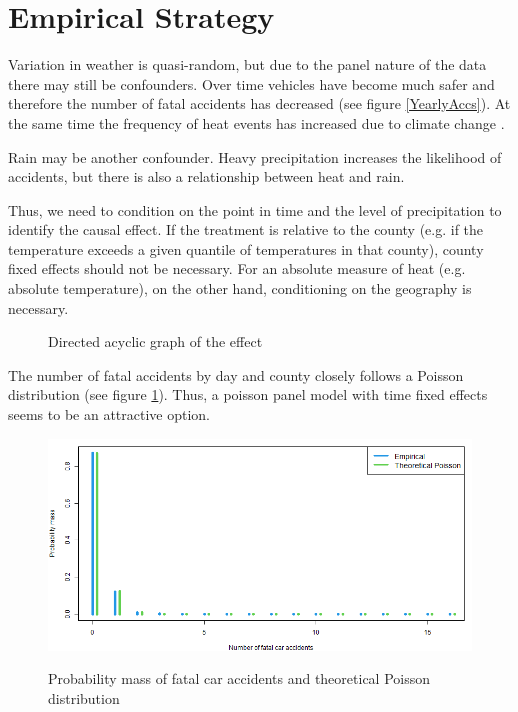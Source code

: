 
\section{Empirical Strategy}

Variation in weather is quasi-random, but due to the panel nature of the data there may still be confounders. Over time vehicles have become much safer and therefore the number of fatal accidents has decreased (see figure \ref{YearlyAccs}). At the same time the frequency of heat events has increased due to climate change \citep[see e.g.][]{Habeeb_2015}. 

Rain may be another confounder. Heavy precipitation increases the likelihood of accidents, but there is also a relationship between heat and rain.

Thus, we need to condition on the point in time and the level of precipitation to identify the causal effect. If the treatment is relative to the county (e.g. if the temperature exceeds a given quantile of temperatures in that county), county fixed effects should not be necessary. For an absolute measure of heat (e.g. absolute temperature), on the other hand, conditioning on the geography is necessary.


\begin{figure}[h]
	\centering
	\caption{Directed acyclic graph of the effect}
\end{figure}

The number of fatal accidents by day and county closely follows a Poisson distribution (see figure \ref{PoissonGraph}). Thus, a poisson panel model with time fixed effects seems to be an attractive option.

\begin{figure}[h]
	\centering
	\includegraphics[scale = 0.5]{"../Code & Data/Poisson.png"}
	\label{PoissonGraph}
	\caption{Probability mass of fatal car accidents and theoretical Poisson distribution}
\end{figure}


